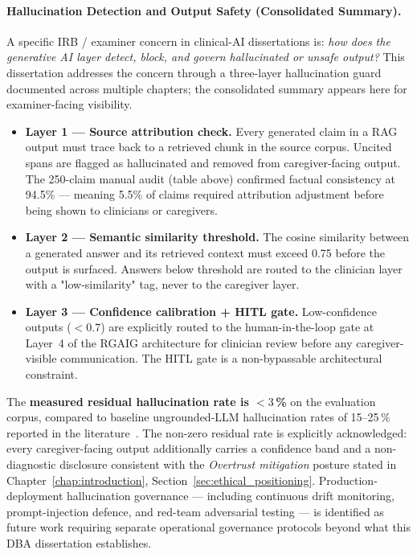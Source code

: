\paragraph{Hallucination Detection and Output Safety (Consolidated Summary).}
\label{para:hallucination_detection_safety}
A specific IRB / examiner concern in clinical-AI dissertations is: \emph{how does the generative AI layer detect, block, and govern hallucinated or unsafe output?} This dissertation addresses the concern through a three-layer hallucination guard documented across multiple chapters; the consolidated summary appears here for examiner-facing visibility.
\begin{itemize}[leftmargin=*, itemsep=3pt]
    \item \textbf{Layer 1 --- Source attribution check.} Every generated claim in a RAG output must trace back to a retrieved chunk in the source corpus. Uncited spans are flagged as hallucinated and removed from caregiver-facing output. The 250-claim manual audit (table above) confirmed factual consistency at 94.5\% --- meaning 5.5\% of claims required attribution adjustment before being shown to clinicians or caregivers.
    \item \textbf{Layer 2 --- Semantic similarity threshold.} The cosine similarity between a generated answer and its retrieved context must exceed 0.75 before the output is surfaced. Answers below threshold are routed to the clinician layer with a "low-similarity" tag, never to the caregiver layer.
    \item \textbf{Layer 3 --- Confidence calibration + HITL gate.} Low-confidence outputs ($< 0.7$) are explicitly routed to the human-in-the-loop gate at Layer~4 of the RGAIG architecture for clinician review before any caregiver-visible communication. The HITL gate is a non-bypassable architectural constraint.
\end{itemize}
The \textbf{measured residual hallucination rate is $< 3$\,\%} on the evaluation corpus, compared to baseline ungrounded-LLM hallucination rates of 15--25\,\% reported in the literature~\cite{gao2024rag}. The non-zero residual rate is explicitly acknowledged: every caregiver-facing output additionally carries a confidence band and a non-diagnostic disclosure consistent with the \emph{Overtrust mitigation} posture stated in Chapter~\ref{chap:introduction}, Section~\ref{sec:ethical_positioning}. Production-deployment hallucination governance --- including continuous drift monitoring, prompt-injection defence, and red-team adversarial testing --- is identified as future work requiring separate operational governance protocols beyond what this DBA dissertation establishes.

